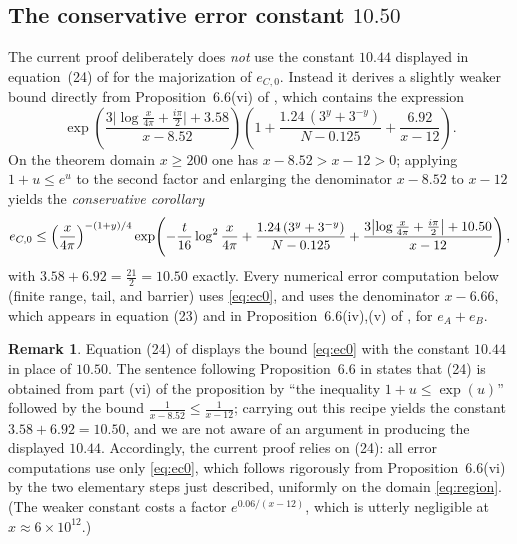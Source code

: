 \documentclass[11pt]{article}
\theoremstyle{definition}
\newtheorem{remark}[theorem]{Remark}
\begin{document}
\subsection{The conservative error constant $10.50$}\label{sec:weld}

The current proof deliberately does \emph{not} use the constant $10.44$
displayed in equation~(24) of \cite{Polymath} for the majorization of
$e_{C,0}$.
Instead it derives a
slightly weaker bound directly from Proposition~6.6(vi) of
\cite{Polymath}, which contains the expression
\[
\exp\!\left(\frac{3\bigl|\log\frac{x}{4\pi}+\frac{i\pi}2\bigr|+3.58}{x-8.52}\right)
\left(1+\frac{1.24\,(3^y+3^{-y})}{N-0.125}+\frac{6.92}{x-12}\right).
\]
On the theorem domain $x\ge200$ one has $x-8.52>x-12>0$; applying
$1+u\le e^u$ to the second factor and enlarging the denominator
$x-8.52$ to $x-12$ yields the \emph{conservative corollary}
\begin{equation}\label{eq:ec0}
e_{C,0}\le
\Bigl(\frac{x}{4\pi}\Bigr)^{-(1+y)/4}
\exp\!\left(
-\frac{t}{16}\log^2\frac{x}{4\pi}
+\frac{1.24\,(3^y+3^{-y})}{N-0.125}
+\frac{3\bigl|\log\frac{x}{4\pi}+\frac{i\pi}2\bigr|+10.50}{x-12}
\right),
\end{equation}
with $3.58+6.92=\tfrac{21}2=10.50$ exactly. Every numerical error
computation below (finite range, tail, and barrier) uses
\eqref{eq:ec0}, and uses the denominator $x-6.66$, which appears in
equation (23) and in Proposition~6.6(iv),(v) of \cite{Polymath}, for
$e_A+e_B$.

\begin{remark}\label{rem:1044}
Equation (24) of \cite{Polymath} displays the bound \eqref{eq:ec0}
with the constant $10.44$ in place of $10.50$. The sentence following
Proposition~6.6 in \cite{Polymath} states that (24) is obtained from
part (vi) of the proposition by ``the inequality $1+u\le\exp(u)$''
followed by the bound $\frac{1}{x-8.52}\le\frac{1}{x-12}$; carrying
out this recipe yields the constant $3.58+6.92=10.50$, and we are not
aware of an argument in \cite{Polymath} producing the displayed
$10.44$. Accordingly, the current proof relies on (24): all error computations use only
\eqref{eq:ec0}, which follows rigorously from Proposition~6.6(vi) by
the two elementary steps just described, uniformly on the domain
\eqref{eq:region}. (The weaker constant costs a factor
$e^{0.06/(x-12)}$, which is utterly negligible at
$x\approx6\times10^{12}$.)
\end{remark}

\end{document}
